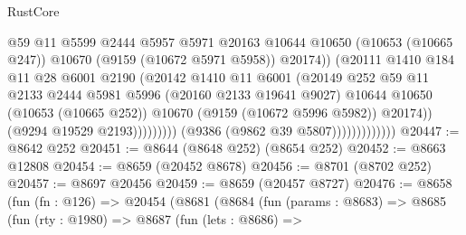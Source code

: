 \begin{lexlean}{RustCore}
\begin{coremodule}
                                            @59
                                            @11
                                            @5599
                                            @2444
                                            @5957
                                            @5971
                                            @20163
                                            @10644
                                            @10650
                                            (@10653 (@10665 @247))
                                            @10670
                                            (@9159 (@10672 @5971 @5958))
                                            @20174))
                                        (@20111
                                          @1410
                                          @184
                                          @11
                                          @28
                                          @6001
                                          @2190
                                          (@20142
                                            @1410
                                            @11
                                            @6001
                                            (@20149
                                              @252
                                              @59
                                              @11
                                              @2133
                                              @2444
                                              @5981
                                              @5996
                                              (@20160 @2133 @19641 @9027)
                                              @10644
                                              @10650
                                              (@10653 (@10665 @252))
                                              @10670
                                              (@9159 (@10672 @5996 @5982))
                                              @20174))
                                          (@9294 @19529 @2193)))))))))
                          (@9386 (@9862 @39 @5807)))))))))))))
@20447 := @8642 @252
@20451 := @8644 (@8648 @252) (@8654 @252)
@20452 := @8663 @12808
@20454 := @8659 (@20452 @8678)
@20456 := @8701 (@8702 @252)
@20457 := @8697 @20456
@20459 := @8659 (@20457 @8727)
@20476 := @8658
    (fun (fn : @126) =>
    @20454
      (@8681
        (@8684
          (fun (params : @8683) =>
          @8685
            (fun (rty : @1980) =>
            @8687
              (fun (lets : @8686) =>

\end{coremodule}
\end{lexlean}
